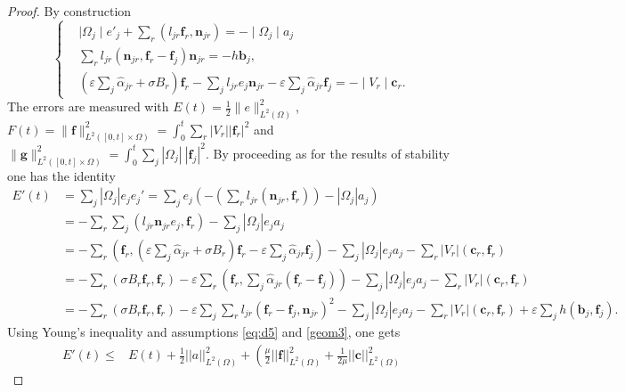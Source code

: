 \documentclass[a4paper,french,english,10pt]{article}
\newcommand\ljr{l_{jr}}
\newcommand\njr{\mathbf{n}_{jr}}
\newcommand\eps{\varepsilon}
\newcommand\alj{\widehat{\alpha}_{jr}}
\newcommand\fj{\mathbf{f}_j}
\newcommand\fr{\mathbf{f}_r}
\newcommand\cc{\mathbf{c}}
\newcommand\bb{\mathbf{b}}
\newcommand\ccr{\cc_r}
\newcommand\bj{\bb_j}
\newcommand\ff{\mathbf{f}}
\newcommand\gf{\mathbf{g}}
\begin{document}
\begin{proof}
By construction
\begin{equation*}\label{eq:d30}
\left\{ 
\begin{aligned}
& \mid\Omega_{j}\mid e'_{j}+
\sum_{r}(l_{jr}\fr,\njr)=-\mid\Omega_{j}\mid a_j\\
& \sum_{r}l_{jr} (\njr,\fr -\fj)\njr=-h\bj,  \\
& \left( \eps\sum_{j}\alj+  \sigma B_r\right)\fr-
\sum_{j}\ljr e_j\njr-\eps\sum_j\alj\fj=-\mid
V_r\mid\ccr .
\end{aligned}
\right.
\end{equation*}
The errors are measured with
$
E(t)=\frac12  \| e \|_{L^2(\Omega)}^2 $, 
$
F(t)=
\| \ff \|_{L^2([0,t]\times \Omega)}^2=
 \int_0^t \sum_r \left| V_r \right| |\fr|^2
$
and 
$
\| \gf \|_{L^2([0,t]\times \Omega)}^2=  \int_0^t
\sum_j
 \left| \Omega_j \right| \   \left| \fj  \right|^2 $.
By proceeding as for the results of stability one has the identity
\begin{equation*}
\begin{aligned}
E'(t)&= \sum_j |\Omega_j| e_j e_j'=
\sum_j  e_j\left(
- \left( \sum_r l_{jr}\left(\njr, \fr  
   \right)\right)
- \left| \Omega_j \right| a_j 
\right) \\
&
=- \sum_r \sum_j (  l_{jr}  \mathbf n_{jr} e_j , \mathbf f_r)
- \sum_j\left| \Omega_j \right| e_j a_j \\
&= -\sum_r \left (\fr, \left( \eps\sum_{j}\alj+  \sigma
B_r\right)\fr- \eps\sum_j\alj\fj\right )
- \sum_j \left| \Omega_j \right| e_ja_j
- \sum_r \left| V_r \right| (\ccr, \fr) \\
&= -\sum_r \left (\sigma B_r \fr, \fr\right ) 
-\eps \sum_r\left( \fr, \sum_j \alj(\fr -\fj ) \right )
- \sum_j \left| \Omega_j \right| e_j a_j
- \sum_r \left| V_r \right| (\ccr, \fr) \\
&= -\sum_r \left (\sigma B_r \fr, \fr\right ) 
-\eps\sum_j\sum_r \ljr \left( \fr- \fj,  \njr\right )^2
- \sum_j \left| \Omega_j \right| e_j a_j
- \sum_r \left| V_r \right| (\ccr ,\fr) +\eps\sum_j h (\bj,\fj).
\end{aligned}
\end{equation*}
Using  Young's inequality %
 and assumptions \eqref{eq:d5} and \eqref{geom3}, one gets
\begin{equation} \label{eq:yi}
\begin{aligned}
E'(t) \leq & E(t) %
 + \frac12 ||a||_{L^2(\Omega)}^2 +
\left(
\frac{\mu}{2} ||\ff ||^2_{L^2(\Omega)} + \frac{1}{2\mu} ||\cc||^2_{L^2(\Omega)} 

\end{aligned}
\end{equation}
\end{proof}
\end{document}
